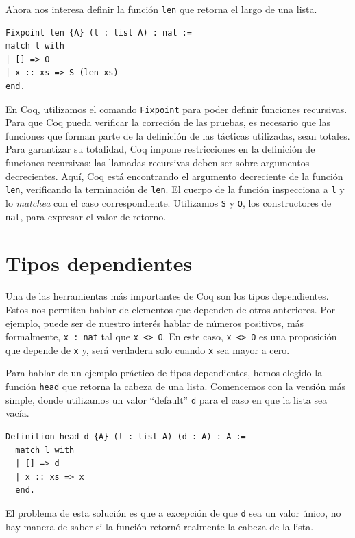 Ahora nos interesa definir la función \lstinline{len} que retorna el largo de una lista.

\begin{lstlisting}
Fixpoint len {A} (l : list A) : nat :=
match l with
| [] => O
| x :: xs => S (len xs)
end.
\end{lstlisting}

En Coq, utilizamos el comando \lstinline{Fixpoint} para poder definir funciones recursivas.
Para que Coq pueda verificar la correción de las pruebas, es necesario que las funciones que forman parte de la definición de las tácticas utilizadas, sean totales.
Para garantizar su totalidad, Coq impone restricciones en la definición de funciones recursivas: las llamadas recursivas deben ser sobre argumentos decrecientes.
Aquí, Coq está encontrando el argumento decreciente de la función \lstinline{len}, verificando la terminación de \lstinline{len}.
El cuerpo de la función inspecciona a \lstinline{l} y lo \textit{matchea} con el caso correspondiente. Utilizamos \lstinline{S} y \lstinline{O}, los constructores de \lstinline{nat}, para expresar el valor de retorno.

\section{Tipos dependientes}

Una de las herramientas más importantes de Coq son los tipos dependientes. Estos nos permiten hablar de elementos que dependen de otros anteriores. Por ejemplo, puede ser de nuestro interés hablar de números positivos, más formalmente, \lstinline{x : nat} tal que \lstinline{x <> O}. En este caso, \lstinline{x <> O} es una proposición que depende de \lstinline{x} y, será verdadera solo cuando \lstinline{x} sea mayor a cero.

Para hablar de un ejemplo práctico de tipos dependientes, hemos elegido la función \lstinline{head} que retorna la cabeza de una lista. Comencemos con la versión más simple, donde utilizamos un valor ``default'' \lstinline{d} para el caso en que la lista sea vacía.

\begin{lstlisting}
Definition head_d {A} (l : list A) (d : A) : A :=
  match l with
  | [] => d
  | x :: xs => x
  end.
\end{lstlisting}

El problema de esta solución es que a excepción de que \lstinline{d} sea un valor único, no hay manera de saber si la función retornó realmente la cabeza de la lista.

